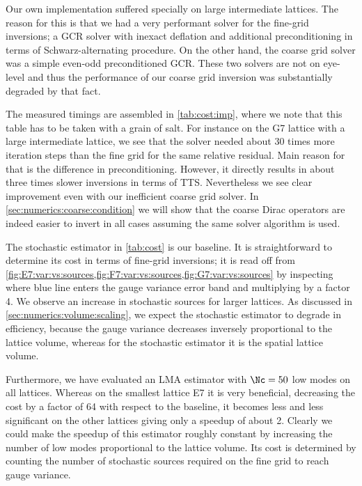 Our own implementation suffered specially on large intermediate lattices.
The reason for this is that we had a very performant solver for the fine-grid inversions; a GCR solver with inexact deflation and additional preconditioning in terms of Schwarz-alternating procedure.
On the other hand, the coarse grid solver was a simple even-odd preconditioned GCR.
These two solvers are not on eye-level and thus the performance of our coarse grid inversion was substantially degraded by that fact.

The measured timings are assembled in \cref{tab:cost:imp}, where we note that this table has to be taken with a grain of salt.
For instance on the G7 lattice with a large intermediate  lattice, we see that the  solver needed about \num{30} times more iteration steps than the fine grid  for the same relative residual.
Main reason for that is the difference in preconditioning.
However, it directly results in about three times slower inversions in terms of TTS.
Nevertheless we see clear improvement even with our inefficient coarse grid solver.
In \cref{sec:numerics:coarse:condition} we will show that the coarse Dirac operators are indeed easier to invert in all cases assuming the same solver algorithm is used.

The stochastic estimator in \cref{tab:cost} is our baseline.
It is straightforward to determine its cost in terms of fine-grid inversions; it is read off from \cref{fig:E7:var:vs:sources,fig:F7:var:vs:sources,fig:G7:var:vs:sources} by inspecting where blue line enters the gauge variance error band and multiplying by a factor \num{4}.
We observe an increase in stochastic sources for larger lattices.
As discussed in \cref{sec:numerics:volume:scaling}, we expect the stochastic estimator to degrade in efficiency, because the gauge variance decreases inversely proportional to the lattice volume, whereas for the stochastic estimator it is the spatial lattice volume.

Furthermore, we have evaluated an LMA estimator with $\Nc=50$ low modes on all lattices.
Whereas on the smallest lattice E7 it is very beneficial, decreasing the cost by a factor of \num{64} with respect to the baseline, it becomes less and less significant on the other lattices giving only a speedup of about \num{2}.
Clearly we could make the speedup of this estimator roughly constant by increasing the number of low modes proportional to the lattice volume.
Its cost is determined by counting the number of stochastic sources required on the fine grid to reach gauge variance.

